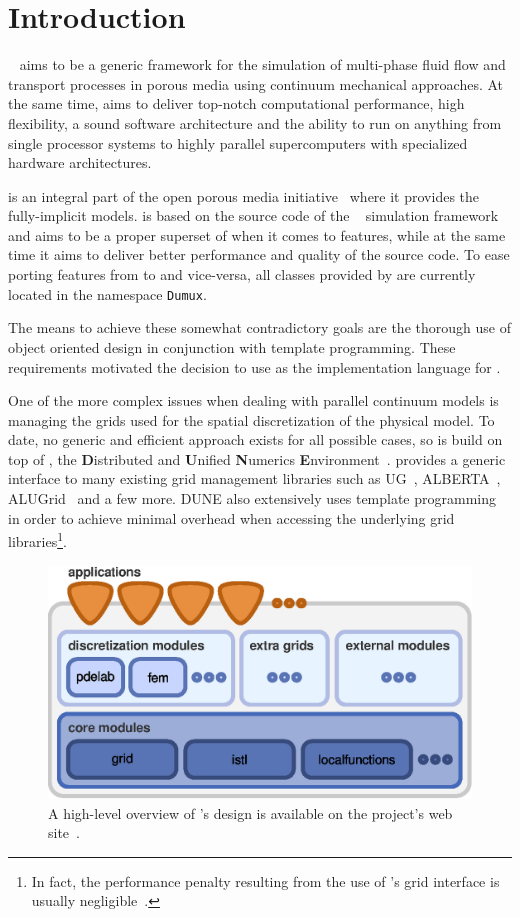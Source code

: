 \chapter{Introduction}

\eWoms~\cite{EWOMS-HP} aims to be a generic framework for the simulation of multi-phase
fluid flow and transport processes in porous media using continuum
mechanical approaches.  At the same time, \eWoms aims to deliver
top-notch computational performance, high flexibility, a sound
software architecture and the ability to run on anything from single
processor systems to highly parallel supercomputers with specialized
hardware architectures.

\eWoms is an integral part of the open porous media
initiative~\cite{OPM-HP} where it provides the fully-implicit
models. \eWoms is based on the source code of the
\Dumux~\cite{DUMUX-HP} simulation framework and aims to be a proper
superset of \Dumux when it comes to features, while at the same time
it aims to deliver better performance and quality of the source
code. To ease porting features from \Dumux to \eWoms and vice-versa,
all classes provided by \eWoms are currently located in the namespace
\texttt{Dumux}.

The means to achieve these somewhat contradictory goals are the
thorough use of object oriented design in conjunction with template
programming. These requirements motivated the decision to use
\Cplusplus as the implementation language for \eWoms.

One of the more complex issues when dealing with parallel continuum
models is managing the grids used for the spatial discretization of
the physical model. To date, no generic and efficient approach exists
for all possible cases, so \eWoms is build on top of \Dune, the
\textbf{D}istributed and \textbf{U}nified \textbf{N}umerics
\textbf{E}nvironment~\cite{DUNE-HP}. \Dune provides a generic interface
to many existing grid management libraries such as UG~\cite{UG-HP},
ALBERTA~\cite{ALBERTA-HP}, ALUGrid~\cite{ALUGRID-HP} and a few
more. DUNE also extensively uses template programming in order to
achieve minimal overhead when accessing the underlying grid
libraries\footnote{In fact, the performance penalty resulting from the
use of \Dune's grid interface is usually negligible~\cite{BURRI2006}.}.
\begin{figure}[hbt]
  \centering 
  \includegraphics[width=.5\linewidth, keepaspectratio]{EPS/dunedesign}
  \caption{
    \label{fig:dune-design}
    A high-level overview of \Dune's design is available on the project's
    web site~\cite{DUNE-HP}.
  }
\end{figure}

